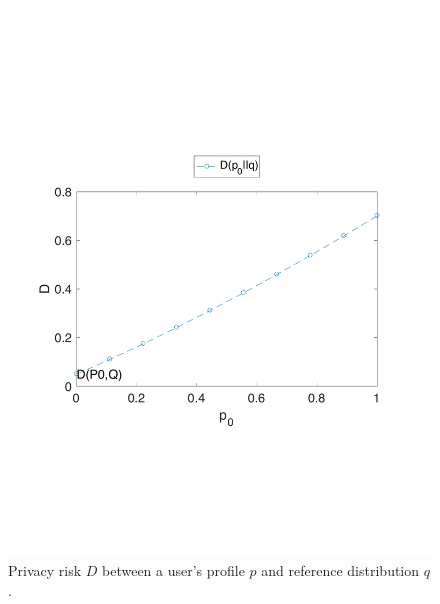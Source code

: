 \begin{figure}[htb]
\includegraphics[scale=\textwidth]{figures/example_2_D.pdf}
\caption[Privacy risk between a user profile and a given reference distribution]{Privacy risk $D$ between a user's profile $p$ and reference distribution $q$.}
\label{fig:5}
\end{figure}

